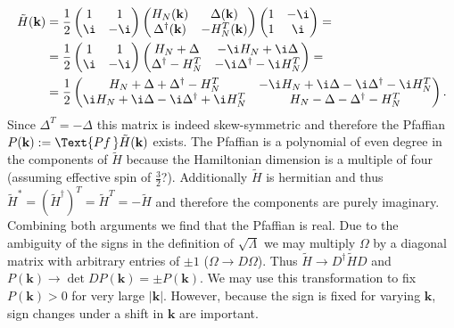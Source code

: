 \documentclass[english, parskip=full]{scrartcl}
\begin{document}
\begin{align}
\tilde{H}(\textbf{k}) &= \frac{1}{2} \begin{pmatrix}
1 & 1 \\ \i & -\i
\end{pmatrix} \begin{pmatrix}
H_N(\textbf{k}) & \Delta(\textbf{k}) \\ \Delta^\dagger(\textbf{k}) & - H_N^T(\textbf{k})
\end{pmatrix} \begin{pmatrix}
1 & -\i \\ 1 & \i
\end{pmatrix} = \\
&= \frac{1}{2} \begin{pmatrix}
1 & 1 \\ \i & -\i
\end{pmatrix} \begin{pmatrix}
H_N + \Delta & -\i H_N + \i \Delta \\ 
\Delta^\dagger - H_N^T & -\i \Delta^\dagger- \i H_N^T
\end{pmatrix} = \\
&= \frac{1}{2} \begin{pmatrix}
H_N + \Delta + \Delta^\dagger - H_N^T & -\i H_N + \i \Delta -\i \Delta^\dagger- \i H_N^T \\
\i H_N + \i \Delta -\i \Delta^\dagger +\i H_N^T & H_N - \Delta - \Delta^\dagger - H_N^T
\end{pmatrix}.
\end{align}
Since $\Delta^T = -\Delta$ this matrix is indeed skew-symmetric and therefore the Pfaffian $P(\textbf{k}) := \Text{Pf\,} \tilde{H}(\textbf{k})$ exists.
The Pfaffian is a polynomial of even degree in the components of $\tilde{H}$ because the Hamiltonian dimension is a multiple of four (\color{red}assuming effective spin of $\frac{3}{2}$?\color{black}).
Additionally $\tilde{H}$ is hermitian and thus $\tilde{H}^\ast = (\tilde{H}^\dagger)^T = \tilde{H}^T = -\tilde{H}$ and therefore the components are purely imaginary.
Combining both arguments we find that the Pfaffian is real.
Due to the ambiguity of the signs in the definition of $\sqrt{\Lambda}$ we may multiply $\Omega$ by a diagonal matrix with arbitrary entries of $\pm 1$ ($\Omega \rightarrow D\Omega$).
Thus $\tilde{H} \rightarrow D^\dagger\tilde{H}D$ and $P(\textbf{k}) \rightarrow \det D P(\textbf{k}) = \pm P(\textbf{k})$.
We may use this transformation to fix $P(\textbf{k})>0$ for very large $|\textbf{k}|$.
However, because the sign is fixed for varying $\textbf{k}$, sign changes under a shift in $\textbf{k}$ are important.
\end{document}
